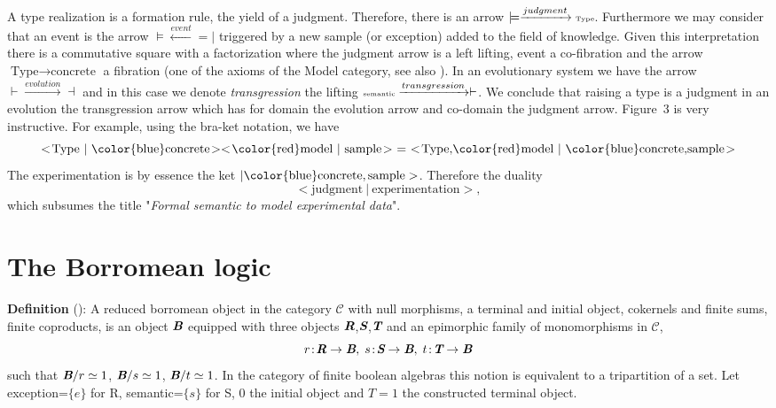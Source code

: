 A type realization is a formation rule, the yield of a judgment. Therefore,
there is an arrow 
$\models\xrightarrow{judgment}\text{\tiny Type}$.
Furthermore we may consider that an event is the arrow 
$\models\xleftarrow{event}=\!\!\!|$ triggered by a new sample (or exception) added to the field of knowledge.
Given this interpretation there is a commutative square with a factorization where the 
judgment arrow is a left lifting, event a co-fibration and the arrow  
$\text{Type}\rightarrow\text{concrete}$
a fibration (one of the axioms of the Model category, see also \cite{awodey_2009}).
In an evolutionary system we have the arrow 
$\overset{}{\vdash}\xrightarrow{evolution}\overset{}{\dashv}$
and in this case we denote {\it transgression} the lifting 
$\overset{}{\text{\tiny semantic}}\xrightarrow{transgression}\overset{}{\vdash}$.  
We conclude that raising a type is a judgment in an evolution the transgression
arrow which has for domain the evolution arrow and co-domain the judgment arrow.
Figure~3 is very instructive. For example, using the bra-ket notation,
we have \begin{displaymath}
<\!\text{Type}~|~\text{\color{blue}concrete}\!
><\!\text{\color{red}model}~|~\text{sample}\!>~ =~ 
<\!\text{Type,{\color{red}model}}~|~\text{{\color{blue}concrete},sample}\!>
\end{displaymath}
The experimentation is by essence the ket $|\text{\color{blue}concrete},\text{sample}>$. Therefore
the duality 
\begin{displaymath}
<\!\text{judgment}~|~\text{experimentation}\!>,
\end{displaymath}
which subsumes the title "{\it Formal semantic to model experimental data}".

\section{The Borromean logic}
{\bf Definition} (\cite{guitart_2012}): A reduced borromean object in the category $\mathcal{C}$ with null morphisms,
a terminal and initial object, cokernels and finite sums, finite coproducts, is an object 
$\textbf{\em {B}}$ equipped with three objects $\textbf{\em {R}}$,$\textbf{\em {S}}$,$\textbf{\em {T}}$ and an epimorphic 
family of monomorphisms in  $\mathcal{C}$,
\begin{displaymath}
	r\!:\!\textbf{\em {R}}\rightarrow\textbf{\em {B}},\; s\!:\!\textbf{\em {S}}\rightarrow\textbf{\em {B}},\; t\!:\!\textbf{\em {T}}\rightarrow\textbf{\em {B}}
\end{displaymath}
such that 
$\textbf{\em {B}}/r\simeq 1$,  
$\textbf{\em {B}}/s\simeq 1$,
$\textbf{\em {B}}/t\simeq 1$. In the category of finite boolean algebras this notion is equivalent to a tripartition of a set.
Let 
exception=$\{e\}$ for R, 
semantic=$\{s\}$ for S,
0 the initial object and $T=1$ the constructed terminal object.

